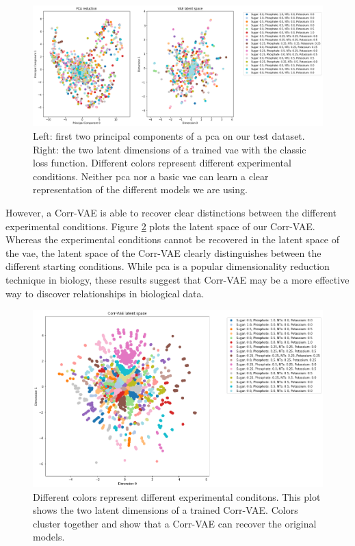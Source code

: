 \begin{figure}[t!]
\begin{center}
\includegraphics[width=1.2\textwidth]{figs/vae_vs_pca_latent.png}
\caption[Comparison of the latent dimensions \gls{pca} and \gls{vae}]{Left: first two principal components of a \gls{pca} on our test dataset.
Right: the two latent dimensions of a trained \gls{vae} with the classic loss function.
Different colors represent different experimental conditions.
Neither \gls{pca} nor a basic \gls{vae} can learn a clear representation of the different models we are using.}
\label{fig:vae_pca}
\end{center}
\end{figure}

However, a Corr-VAE is able to recover clear distinctions between the different experimental conditions.
Figure \ref{fig:corrvae_2d} plots the latent space of our Corr-VAE.
Whereas the experimental conditions cannot be recovered in the latent space of the \gls{vae}, the latent space of the Corr-VAE clearly distinguishes between the different starting conditions.
While \gls{pca} is a popular dimensionality reduction technique in biology, these results suggest that Corr-VAE may be a more effective way to discover relationships in biological data.

\begin{figure}[t!]
\begin{center}
\includegraphics[width=1.01\textwidth]{figs/corrvae_hand_2d_latent.png}
\caption[Latent dimensions of our Corr-VAE network]{Different colors represent different experimental conditons.
This plot shows the two latent dimensions of a trained Corr-VAE.
Colors cluster together and show that a Corr-VAE can recover the original models.}
\label{fig:corrvae_2d}
\end{center}
\end{figure}

